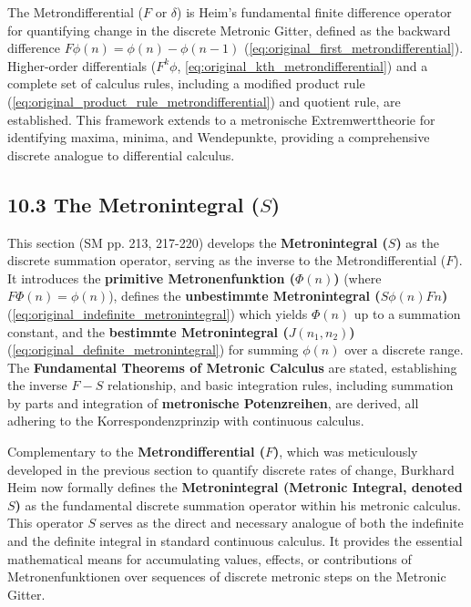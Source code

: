 \documentclass[12pt]{article}
\newcommand{\metrondifferential}{F} %
\newcommand{\metronintegral}{S} %
\begin{document}
The Metrondifferential (\(\metrondifferential\) or \(\delta\)) is Heim's fundamental finite difference operator for quantifying change in the discrete Metronic Gitter, defined as the backward difference \( F\phi(n) = \phi(n) - \phi(n-1) \) (\eqref{eq:original_first_metrondifferential}). Higher-order differentials (\(F^k\phi\), \eqref{eq:original_kth_metrondifferential}) and a complete set of calculus rules, including a modified product rule (\eqref{eq:original_product_rule_metrondifferential}) and quotient rule, are established. This framework extends to a metronische Extremwerttheorie for identifying maxima, minima, and Wendepunkte, providing a comprehensive discrete analogue to differential calculus.

\subsection{10.3 The Metronintegral (\texorpdfstring{\( \metronintegral \)}{S})}
\label{sec:metronintegral}

This section (SM pp. 213, 217-220) develops the \textbf{Metronintegral (\(\metronintegral\))} as the discrete summation operator, serving as the inverse to the Metrondifferential (\(\metrondifferential\)). It introduces the \textbf{primitive Metronenfunktion (\(\Phi(n)\))} (where \(F\Phi(n) = \phi(n)\)), defines the \textbf{unbestimmte Metronintegral (\( S\phi(n)Fn \))} (\eqref{eq:original_indefinite_metronintegral}) which yields \(\Phi(n)\) up to a summation constant, and the \textbf{bestimmte Metronintegral (\( J(n_1, n_2) \))} (\eqref{eq:original_definite_metronintegral}) for summing \(\phi(n)\) over a discrete range. The \textbf{Fundamental Theorems of Metronic Calculus} are stated, establishing the inverse \(F-S\) relationship, and basic integration rules, including summation by parts and integration of \textbf{metronische Potenzreihen}, are derived, all adhering to the Korrespondenzprinzip with continuous calculus.

Complementary to the \textbf{Metrondifferential (\( \metrondifferential \))}, which was meticulously developed in the previous section to quantify discrete rates of change, Burkhard Heim now formally defines the \textbf{Metronintegral (Metronic Integral, denoted \( \metronintegral \))} as the fundamental discrete summation operator within his metronic calculus. This operator \( \metronintegral \) serves as the direct and necessary analogue of both the indefinite and the definite integral in standard continuous calculus. It provides the essential mathematical means for accumulating values, effects, or contributions of Metronenfunktionen over sequences of discrete metronic steps on the Metronic Gitter.
\end{document}
